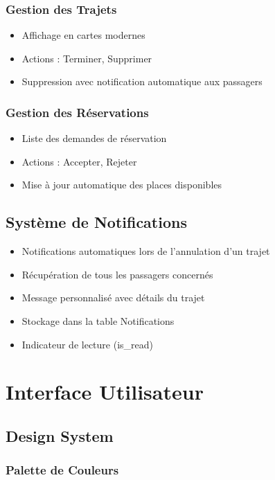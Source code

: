 \documentclass[12pt,a4paper]{report}
\begin{document}
\subsection{Gestion des Trajets}
\begin{itemize}
    \item Affichage en cartes modernes
    \item Actions : Terminer, Supprimer
    \item Suppression avec notification automatique aux passagers
\end{itemize}

\subsection{Gestion des Réservations}
\begin{itemize}
    \item Liste des demandes de réservation
    \item Actions : Accepter, Rejeter
    \item Mise à jour automatique des places disponibles
\end{itemize}

\section{Système de Notifications}

\begin{itemize}
    \item Notifications automatiques lors de l'annulation d'un trajet
    \item Récupération de tous les passagers concernés
    \item Message personnalisé avec détails du trajet
    \item Stockage dans la table Notifications
    \item Indicateur de lecture (is\_read)
\end{itemize}

\chapter{Interface Utilisateur}

\section{Design System}

\subsection{Palette de Couleurs}
\end{document}
